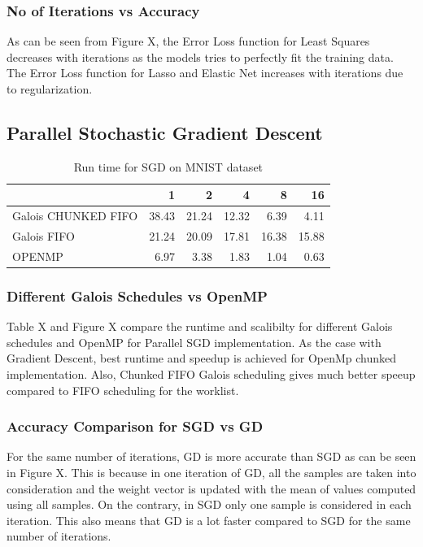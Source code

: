 \documentclass{sigplanconf}
\begin{document}
   	\subsubsection{No of Iterations vs Accuracy}
	As can be seen from Figure X, the Error Loss function for Least Squares decreases with iterations as the models
	tries to perfectly fit the training data. The Error Loss function for Lasso and Elastic Net increases with iterations
	due to regularization.

\subsection{Parallel Stochastic Gradient Descent}
\begin{table}[htbp]
\caption{Run time for SGD on MNIST dataset}
\begin{tabular}{|l|r|r|r|r|r|}
\hline
 & 1 & 2 & 4 & 8 & 16 \\ \hline
Galois CHUNKED FIFO & 38.43 & 21.24 & 12.32 & 6.39 & 4.11 \\ \hline
Galois FIFO & 21.24 & 20.09 & 17.81 & 16.38 & 15.88 \\ \hline
OPENMP & 6.97 & 3.38 & 1.83 & 1.04 & 0.63 \\ \hline
\end{tabular}
\label{Label of the table}
\end{table}

	\subsubsection{Different Galois Schedules vs OpenMP}
	Table X and Figure X compare the runtime and scalibilty for different Galois schedules and OpenMP for Parallel SGD
	implementation. As the case with Gradient Descent, best runtime and speedup is achieved for OpenMp chunked implementation.
	Also, Chunked FIFO Galois scheduling gives much better speeup compared to FIFO scheduling for the worklist.
	
	\subsubsection{Accuracy Comparison for SGD vs GD}
	For the same number of iterations, GD is more accurate than SGD as can be seen in Figure X. This is because in one iteration
	of GD, all the samples are taken into consideration and the weight vector is updated with the mean of values computed using all
	samples. On the contrary, in SGD only one sample is considered in each iteration. This also means that GD is a lot faster compared
	to SGD for the same number of iterations.
\end{document}
